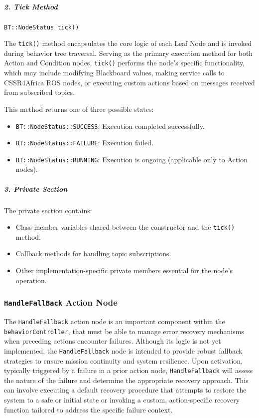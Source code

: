 \documentclass{CSSRforAfrica}
\begin{document}
\subparagraph{2. Tick Method}

\begin{lstlisting}[style=cppstyle]
    BT::NodeStatus tick()
\end{lstlisting}

The \texttt{\small tick()} method encapsulates the core logic of each Leaf Node and is invoked during behavior tree traversal. Serving as the primary execution method for both Action and Condition nodes, \texttt{\small tick()} performs the node's specific functionality, which may include modifying Blackboard values, making service calls to CSSR4Africa ROS nodes, or executing custom actions based on messages received from subscribed topics.

This method returns one of three possible states:
\begin{itemize}
    \item \texttt{\small BT::NodeStatus::SUCCESS}: Execution completed successfully.
    \item \texttt{\small BT::NodeStatus::FAILURE}: Execution failed.
    \item \texttt{\small BT::NodeStatus::RUNNING}: Execution is ongoing (applicable only to Action nodes).
\end{itemize}

\subparagraph{3. Private Section}

The private section contains:
\begin{itemize}
    \item Class member variables shared between the constructor and the \texttt{\small tick()} method.
    \item Callback methods for handling topic subscriptions.
    \item Other implementation-specific private members essential for the node's operation.
\end{itemize}

\subsubsection{\texttt{\small HandleFallBack} Action Node}

The \texttt{\small HandleFallback} action node is an important component within the \\ \texttt{\small behaviorController}, that must be able to manage error recovery mechanisms when preceding actions encounter failures. Although its logic is not yet implemented, the \texttt{\small HandleFallback} node is intended to provide robust fallback strategies to ensure mission continuity and system resilience. Upon activation, typically triggered by a failure in a prior action node, \texttt{\small HandleFallback} will assess the nature of the failure and determine the appropriate recovery approach. This can involve executing a default recovery procedure that attempts to restore the system to a safe or initial state or invoking a custom, action-specific recovery function tailored to address the specific failure context. 
\end{document}
